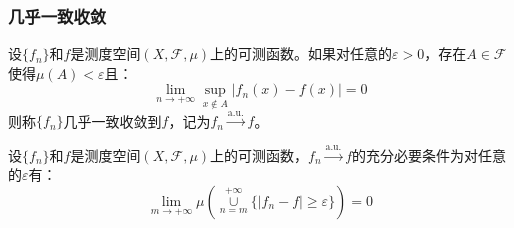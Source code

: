 \subsubsection{几乎一致收敛}
\begin{definition}
	设$\{f_n\}$和$f$是测度空间$(X,\mathscr{F},\mu)$上的可测函数。如果对任意的$\varepsilon>0$，存在$A\in \mathscr{F}$使得$\mu(A)<\varepsilon$且：
	\begin{equation*}
		\lim_{n\to+\infty}\sup_{x\notin A}|f_n(x)-f(x)|=0
	\end{equation*}
	则称$\{f_n\}$几乎一致收敛到$f$，记为$f_n\overset{\text{a.u.}}{\longrightarrow}f$。
\end{definition}
\begin{theorem}\label{theo:EquiConditiona.u.}
	设$\{f_n\}$和$f$是测度空间$(X,\mathscr{F},\mu)$上的可测函数，$f_n\overset{\text{a.u.}}{\longrightarrow}f$的充分必要条件为对任意的$\varepsilon$有：
	\begin{equation*}
		\lim_{m\to+\infty}\mu\left(\underset{n=m}{\overset{+\infty}{\cup}}\{|f_n-f|\geqslant\varepsilon\}\right)=0
	\end{equation*}
\end{theorem}
